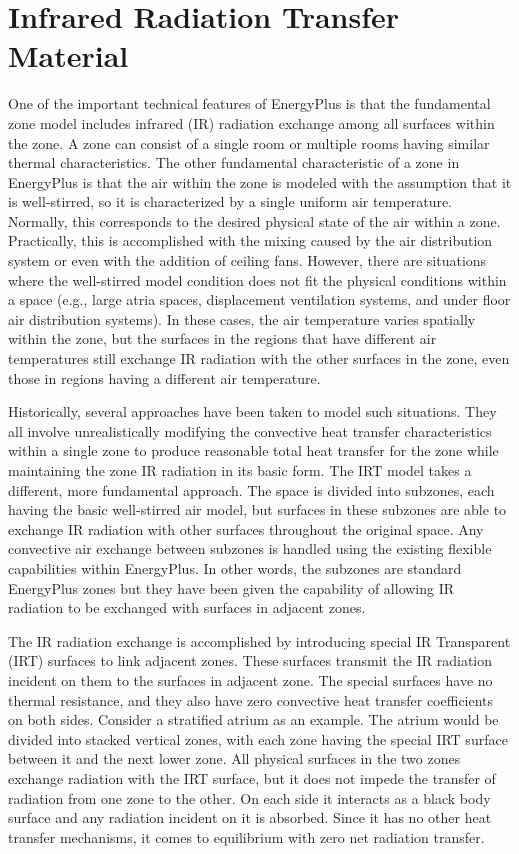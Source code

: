 \section{Infrared Radiation Transfer Material}\label{infrared-radiation-transfer-material}

One of the important technical features of EnergyPlus is that the fundamental zone model includes infrared (IR) radiation exchange among all surfaces within the zone. A zone can consist of a single room or multiple rooms having similar thermal characteristics. The other fundamental characteristic of a zone in EnergyPlus is that the air within the zone is modeled with the assumption that it is well-stirred, so it is characterized by a single uniform air temperature. Normally, this corresponds to the desired physical state of the air within a zone. Practically, this is accomplished with the mixing caused by the air distribution system or even with the addition of ceiling fans. However, there are situations where the well-stirred model condition does not fit the physical conditions within a space (e.g., large atria spaces, displacement ventilation systems, and under floor air distribution systems). In these cases, the air temperature varies spatially within the zone, but the surfaces in the regions that have different air temperatures still exchange IR radiation with the other surfaces in the zone, even those in regions having a different air temperature.

Historically, several approaches have been taken to model such situations. They all involve unrealistically modifying the convective heat transfer characteristics within a single zone to produce reasonable total heat transfer for the zone while maintaining the zone IR radiation in its basic form. The IRT model takes a different, more fundamental approach. The space is divided into subzones, each having the basic well-stirred air model, but surfaces in these subzones are able to exchange IR radiation with other surfaces throughout the original space. Any convective air exchange between subzones is handled using the existing flexible capabilities within EnergyPlus. In other words, the subzones are standard EnergyPlus zones but they have been given the capability of allowing IR radiation to be exchanged with surfaces in adjacent zones.

The IR radiation exchange is accomplished by introducing special IR Transparent (IRT) surfaces to link adjacent zones. These surfaces transmit the IR radiation incident on them to the surfaces in adjacent zone. The special surfaces have no thermal resistance, and they also have zero convective heat transfer coefficients on both sides. Consider a stratified atrium as an example. The atrium would be divided into stacked vertical zones, with each zone having the special IRT surface between it and the next lower zone. All physical surfaces in the two zones exchange radiation with the IRT surface, but it does not impede the transfer of radiation from one zone to the other. On each side it interacts as a black body surface and any radiation incident on it is absorbed. Since it has no other heat transfer mechanisms, it comes to equilibrium with zero net radiation transfer.

